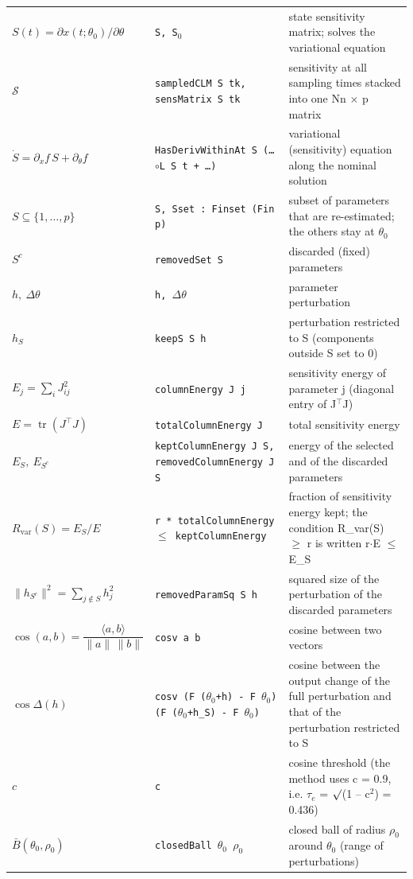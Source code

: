 {\begin{longtable}{@{}>{\raggedright\arraybackslash}p{4.0cm}>{\raggedright\arraybackslash}p{4.6cm}>{\raggedright\arraybackslash}p{7.2cm}@{}}
$S(t)=\partial x(t;\theta_0)/\partial\theta$ & \texttt{S, S$_0$} & state sensitivity matrix; solves the variational equation \\
$\mathcal{S}$ & \texttt{sampledCLM S tk, sensMatrix S tk} & sensitivity at all sampling times stacked into one Nn $\times$ p matrix \\
$\dot S=\partial_x f\,S+\partial_\theta f$ & \texttt{HasDerivWithinAt S (\dots{} $\circ$L S t + \dots{})} & variational (sensitivity) equation along the nominal solution \\
$S\subseteq\{1,\dots,p\}$ & \texttt{S, Sset : Finset (Fin p)} & subset of parameters that are re-estimated; the others stay at $\theta_0$ \\
$S^c$ & \texttt{removedSet S} & discarded (fixed) parameters \\
$h,\ \Delta\theta$ & \texttt{h, $\Delta\theta$} & parameter perturbation \\
$h_S$ & \texttt{keepS S h} & perturbation restricted to S (components outside S set to 0) \\
$E_j=\sum_i J_{ij}^2$ & \texttt{columnEnergy J j} & sensitivity energy of parameter j (diagonal entry of J$^\top$J) \\
$E=\operatorname{tr}(J^\top J)$ & \texttt{totalColumnEnergy J} & total sensitivity energy \\
$E_S,\ E_{S^c}$ & \texttt{keptColumnEnergy J S, removedColumnEnergy J S} & energy of the selected and of the discarded parameters \\
$R_{\mathrm{var}}(S)=E_S/E$ & \texttt{r * totalColumnEnergy $\le$ keptColumnEnergy} & fraction of sensitivity energy kept; the condition R\_var(S) $\ge$ r is written r$\cdot$E $\le$ E\_S \\
$\|h_{S^c}\|^2=\sum_{j\notin S}h_j^2$ & \texttt{removedParamSq S h} & squared size of the perturbation of the discarded parameters \\
$\cos(a,b)=\dfrac{\langle a,b\rangle}{\|a\|\,\|b\|}$ & \texttt{cosv a b} & cosine between two vectors \\
$\cos\Delta(h)$ & \texttt{cosv (F ($\theta_0$+h) - F $\theta_0$) (F ($\theta_0$+h\_S) - F $\theta_0$)} & cosine between the output change of the full perturbation and that of the perturbation restricted to S \\
$c$ & \texttt{c} & cosine threshold (the method uses c = 0.9, i.e. $\tau_e$ = $\surd$(1 -- c$^2$) = 0.436) \\
$\bar B(\theta_0,\rho_0)$ & \texttt{closedBall $\theta_0$ $\rho_0$} & closed ball of radius $\rho_0$ around $\theta_0$ (range of perturbations) \\

\end{longtable}}
